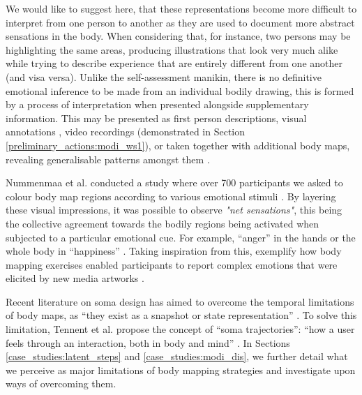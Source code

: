 We would like to suggest here, that these representations become more difficult to interpret from one person to another as they are used to document more abstract sensations in the body. When considering that, for instance, two persons may be highlighting the same areas, producing illustrations that look very much alike while trying to describe experience that are entirely different from one another (and visa versa). Unlike the self-assessment manikin, there is no definitive emotional inference to be made from an individual bodily drawing, this is formed by a process of interpretation when presented alongside supplementary information. This may be presented as first person descriptions, visual annotations \cite{windlin_soma_2019}, video recordings (demonstrated in Section \ref{preliminary_actions:modi_ws1}), or taken together with additional body maps, revealing generalisable patterns amongst them \cite{nummenmaa_bodily_2014}. 

Nummenmaa et al. conducted a study where over 700 participants we asked to colour body map regions according to various emotional stimuli \cite{nummenmaa_bodily_2014}. By layering these visual impressions, it was possible to observe \textit{"net sensations"}, this being the collective agreement towards the bodily regions being activated when subjected to a particular emotional cue. For example, “anger” in the hands or the whole body in “happiness” \cite{davey_where_2021}. Taking inspiration from this, \citeauthor{schino_applying_2021} exemplify how body mapping exercises enabled participants to report complex emotions that were elicited by new media artworks \cite{schino_applying_2021}. 

 Recent literature on soma design has aimed to overcome the temporal limitations of body maps, as “they exist as a snapshot or state representation” \cite{tennent_articulating_2021}. To solve this limitation, Tennent et al. propose the concept of “soma trajectories”: “how a user feels through an interaction, both in body and mind” \cite{tennent_articulating_2021}. In Sections \ref{case_studies:latent_steps} and \ref{case_studies:modi_dis}, we further detail what we perceive as major limitations of body mapping strategies and investigate upon ways of overcoming them.
 
